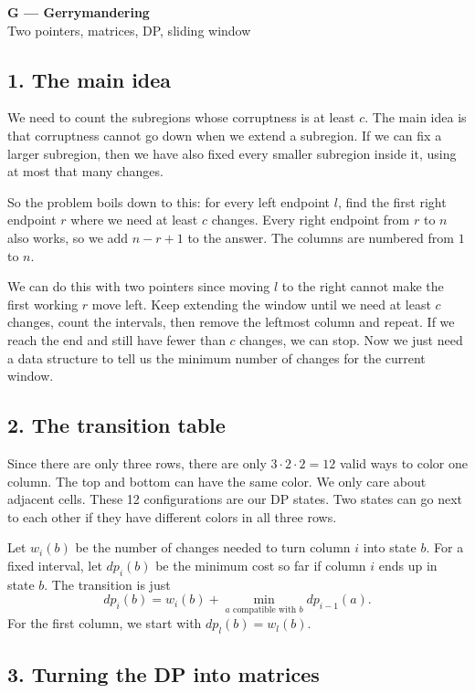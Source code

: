 \documentclass[11pt,a4paper]{article}
\begin{document}
\begin{center}
  {\LARGE\bfseries G --- Gerrymandering}\\[0.5em]
  {\small Two pointers, matrices, DP, sliding window}
\end{center}

\subsection*{1. The main idea}

We need to count the subregions whose corruptness is at least $c$.
The main idea is that corruptness cannot go down when we extend a
subregion. If we can fix a larger subregion, then we have also fixed
every smaller subregion inside it, using at most that many changes.

So the problem boils down to this: for every left endpoint $l$, find the
first right endpoint $r$ where we need at least $c$ changes. Every right
endpoint from $r$ to $n$ also works, so we add $n-r+1$ to the answer.
The columns are numbered from $1$ to $n$.

We can do this with two pointers since moving $l$ to the right cannot
make the first working $r$ move left. Keep extending the window until
we need at least $c$ changes, count the intervals, then remove the leftmost
column and repeat. If we reach the end and still have fewer than $c$
changes, we can stop. Now we just need a data structure to tell us the
minimum number of changes for the current window.

\subsection*{2. The transition table}
Since there are only three rows, there are only $3\cdot2\cdot2=12$
valid ways to color one column. The top and bottom can have the same
color. We only care about adjacent cells. These 12 configurations are
our DP states. Two states can go next to each other if they have
different colors in all three rows.

Let $w_i(b)$ be the number of changes needed to turn column $i$ into
state $b$. For a fixed interval, let $dp_i(b)$ be the minimum cost so far
if column $i$ ends up in state $b$. The transition is just
\[
  dp_i(b)=w_i(b)+\min_{a\text{ compatible with }b}dp_{i-1}(a).
\]
For the first column, we start with $dp_l(b)=w_l(b)$.

\subsection*{3. Turning the DP into matrices}
\end{document}
